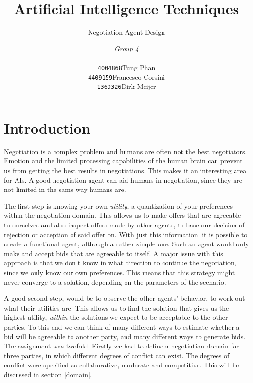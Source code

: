 \documentclass[a4,11pt]{scrartcl}
\title{Artificial Intelligence Techniques}
\subtitle{Negotiation Agent Design}
\author{\emph{Group 4}\\
\begin{tabular}{ll}
\texttt{4004868}&Tung Phan\\
\texttt{4409159}&Francesco Corsini\\
\texttt{1369326}&Dirk Meijer
\end{tabular}}
\begin{document}
\maketitle

\null\vfill
\tableofcontents
\pagebreak

\section{Introduction}

    Negotiation is a complex problem and humans are often not the best 
    negotiators. Emotion and the limited processing capabilities of the 
    human brain can prevent us from getting the best results in 
    negotiations. This makes it an interesting area for AIs. A good 
    negotiation agent can aid humans in negotiation, since they are not 
    limited in the same way humans are.

    The first step is knowing your own \emph{utility}, a quantization 
    of your preferences within the negotiation domain. This allows us 
    to make offers that are agreeable to ourselves and also inspect 
    offers made by other agents, to base our decision of rejection or 
    acception of said offer on. With just this information, it is 
    possible to create a functional agent, although a rather simple 
    one. Such an agent would only make and accept bids that are 
    agreeable to itself. A major issue with this approach is that we 
    don't know in what direction to continue the negotiation, since we 
    only know our own preferences. This means that this strategy might 
    never converge to a solution, depending on the parameters of the 
    scenario.

    A good second step, would be to observe the other agents' behavior, 
    to work out what their utilities are. This allows us to find the 
    solution that gives us the highest utility, \emph{within} the 
    solutions we expect to be acceptable to the other parties. To this 
    end we can think of many different ways to estimate whether a bid 
    will be agreeable to another party, and many different ways to 
    generate bids. \\

    \noindent The assignment was twofold. Firstly we had to define a 
    negotiation domain for three parties, in which different degrees of 
    conflict can exist. The degrees of conflict were specified as 
    collaborative, moderate and competitive. This will be discussed in 
    section \ref{domain}.
\end{document}
